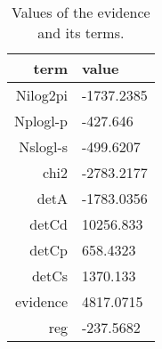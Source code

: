 \begin{table*}\caption{Values of the evidence and its terms.}\begin{center}\begin{tabular}{ r l } term & value \\
\hline Nilog2pi & -1737.2385 \\ 
Nplogl-p & -427.646 \\ 
Nslogl-s & -499.6207 \\ 
chi2 & -2783.2177 \\ 
detA & -1783.0356 \\ 
detCd & 10256.833 \\ 
detCp & 658.4323 \\ 
detCs & 1370.133 \\ 
evidence & 4817.0715 \\ 
reg & -237.5682 \\ 
\hline\end{tabular}\end{center}\label{tab:2}\end{table*}